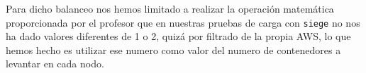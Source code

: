 \bigskip
Para dicho balanceo nos hemos limitado a realizar la operación matemática proporcionada por el profesor que en nuestras pruebas de carga con \texttt{siege} no nos ha dado valores diferentes de 1 o 2, quizá por filtrado de la propia AWS, lo que hemos hecho es utilizar ese numero como valor del numero de contenedores a levantar en cada nodo.





